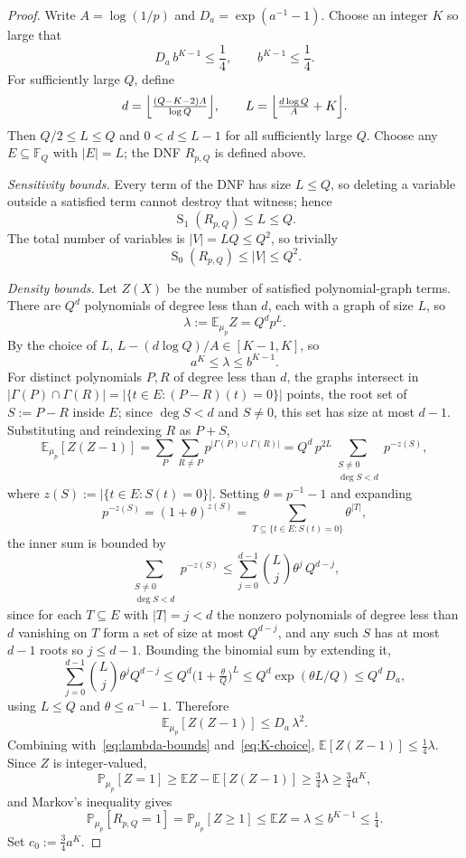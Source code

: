 \documentclass[11pt]{article}
\newcommand{\F}{\mathbb F}
\newcommand{\E}{\mathbb E}
\newcommand{\Prb}{\mathbb P}
\newcommand{\sens}{\operatorname{S}}
\begin{document}
\begin{proof}
Write \(A=\log(1/p)\) and \(D_a=\exp(a^{-1}-1)\). Choose an integer \(K\) so large that
\begin{equation}\label{eq:K-choice}
    D_a\, b^{K-1}\le \frac14,
    \qquad
    b^{K-1}\le \frac14.
\end{equation}
For sufficiently large \(Q\), define
\[
    d=\Bigl\lfloor \tfrac{(Q-K-2)A}{\log Q}\Bigr\rfloor,
    \qquad
    L=\Bigl\lfloor \tfrac{d\log Q}{A}+K\Bigr\rfloor.
\]
Then \(Q/2\le L\le Q\) and \(0<d\le L-1\) for all sufficiently large \(Q\). Choose any \(E\subseteq\F_Q\) with \(|E|=L\); the DNF \(R_{p,Q}\) is defined above.

\emph{Sensitivity bounds.} Every term of the DNF has size \(L\le Q\), so deleting a variable outside a satisfied term cannot destroy that witness; hence
\[
    \sens_1(R_{p,Q})\le L\le Q.
\]
The total number of variables is \(|V|=LQ\le Q^2\), so trivially
\[
    \sens_0(R_{p,Q})\le |V|\le Q^2.
\]

\emph{Density bounds.} Let \(Z(X)\) be the number of satisfied polynomial-graph terms. There are \(Q^d\) polynomials of degree less than \(d\), each with a graph of size \(L\), so
\[
    \lambda:=\E_{\mu_p} Z=Q^d p^L.
\]
By the choice of \(L\), \(L-(d\log Q)/A\in[K-1,K]\), so
\begin{equation}\label{eq:lambda-bounds}
    a^K\le \lambda\le b^{K-1}.
\end{equation}
For distinct polynomials \(P,R\) of degree less than \(d\), the graphs intersect in \(|\Gamma(P)\cap\Gamma(R)|=|\{t\in E:(P-R)(t)=0\}|\) points, the root set of \(S:=P-R\) inside \(E\); since \(\deg S<d\) and \(S\ne 0\), this set has size at most \(d-1\). Substituting and reindexing \(R\) as \(P+S\),
\[
    \E_{\mu_p}[Z(Z-1)]
    =
    \sum_{P}\sum_{R\ne P}p^{|\Gamma(P)\cup\Gamma(R)|}
    =
    Q^d\, p^{2L}\!\!\sum_{\substack{S\ne 0\\ \deg S<d}} p^{-z(S)},
\]
where \(z(S):=|\{t\in E:S(t)=0\}|\). Setting \(\theta=p^{-1}-1\) and expanding
\[
    p^{-z(S)}=(1+\theta)^{z(S)}=\sum_{T\subseteq\{t\in E:S(t)=0\}}\!\!\theta^{|T|},
\]
the inner sum is bounded by
\[
    \sum_{\substack{S\ne 0\\ \deg S<d}} p^{-z(S)}
    \le
    \sum_{j=0}^{d-1}\binom{L}{j}\theta^{j}\, Q^{d-j},
\]
since for each \(T\subseteq E\) with \(|T|=j<d\) the nonzero polynomials of degree less than \(d\) vanishing on \(T\) form a set of size at most \(Q^{d-j}\), and any such \(S\) has at most \(d-1\) roots so \(j\le d-1\). Bounding the binomial sum by extending it,
\[
    \sum_{j=0}^{d-1}\binom{L}{j}\theta^{j} Q^{d-j}
    \le
    Q^d\bigl(1+\tfrac{\theta}{Q}\bigr)^{L}
    \le
    Q^d\exp(\theta L/Q)
    \le
    Q^d\, D_a,
\]
using \(L\le Q\) and \(\theta\le a^{-1}-1\). Therefore
\[
    \E_{\mu_p}[Z(Z-1)]\le D_a\,\lambda^2.
\]
Combining with~\eqref{eq:lambda-bounds} and~\eqref{eq:K-choice}, \(\E[Z(Z-1)]\le \tfrac14\lambda\). Since \(Z\) is integer-valued,
\[
    \Prb_{\mu_p}[Z=1]\ge \E Z-\E[Z(Z-1)]\ge \tfrac34\lambda\ge \tfrac34 a^K,
\]
and Markov's inequality gives
\[
    \Prb_{\mu_p}[R_{p,Q}=1]=\Prb_{\mu_p}[Z\ge 1]\le \E Z=\lambda\le b^{K-1}\le \tfrac14.
\]
Set \(c_0:=\tfrac34 a^K\).


\end{proof}
\end{document}
